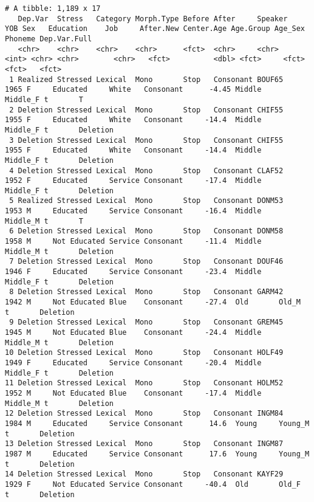 \documentclass[
  12pt,
  letterpaper]{article}
\begin{document}
\begin{verbatim}
# A tibble: 1,189 x 17
   Dep.Var  Stress   Category Morph.Type Before After     Speaker   YOB Sex   Education    Job     After.New Center.Age Age.Group Age_Sex  Phoneme Dep.Var.Full
   <chr>    <chr>    <chr>    <chr>      <fct>  <chr>     <chr>   <int> <chr> <chr>        <chr>   <fct>          <dbl> <fct>     <fct>    <fct>   <fct>       
 1 Realized Stressed Lexical  Mono       Stop   Consonant BOUF65   1965 F     Educated     White   Consonant      -4.45 Middle    Middle_F t       T           
 2 Deletion Stressed Lexical  Mono       Stop   Consonant CHIF55   1955 F     Educated     White   Consonant     -14.4  Middle    Middle_F t       Deletion    
 3 Deletion Stressed Lexical  Mono       Stop   Consonant CHIF55   1955 F     Educated     White   Consonant     -14.4  Middle    Middle_F t       Deletion    
 4 Deletion Stressed Lexical  Mono       Stop   Consonant CLAF52   1952 F     Educated     Service Consonant     -17.4  Middle    Middle_F t       Deletion    
 5 Realized Stressed Lexical  Mono       Stop   Consonant DONM53   1953 M     Educated     Service Consonant     -16.4  Middle    Middle_M t       T           
 6 Deletion Stressed Lexical  Mono       Stop   Consonant DONM58   1958 M     Not Educated Service Consonant     -11.4  Middle    Middle_M t       Deletion    
 7 Deletion Stressed Lexical  Mono       Stop   Consonant DOUF46   1946 F     Educated     Service Consonant     -23.4  Middle    Middle_F t       Deletion    
 8 Deletion Stressed Lexical  Mono       Stop   Consonant GARM42   1942 M     Not Educated Blue    Consonant     -27.4  Old       Old_M    t       Deletion    
 9 Deletion Stressed Lexical  Mono       Stop   Consonant GREM45   1945 M     Not Educated Blue    Consonant     -24.4  Middle    Middle_M t       Deletion    
10 Deletion Stressed Lexical  Mono       Stop   Consonant HOLF49   1949 F     Educated     Service Consonant     -20.4  Middle    Middle_F t       Deletion    
11 Deletion Stressed Lexical  Mono       Stop   Consonant HOLM52   1952 M     Not Educated Blue    Consonant     -17.4  Middle    Middle_M t       Deletion    
12 Deletion Stressed Lexical  Mono       Stop   Consonant INGM84   1984 M     Educated     Service Consonant      14.6  Young     Young_M  t       Deletion    
13 Deletion Stressed Lexical  Mono       Stop   Consonant INGM87   1987 M     Educated     Service Consonant      17.6  Young     Young_M  t       Deletion    
14 Deletion Stressed Lexical  Mono       Stop   Consonant KAYF29   1929 F     Not Educated Service Consonant     -40.4  Old       Old_F    t       Deletion    

\end{verbatim}
\end{document}
